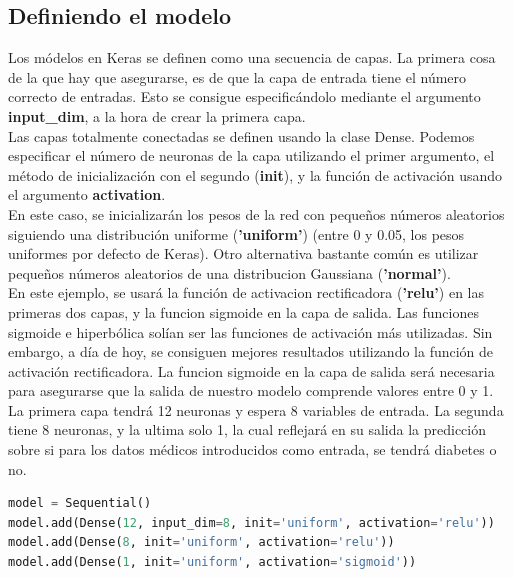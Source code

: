 \subsection{Definiendo el modelo}
Los módelos en Keras se definen como una secuencia de capas. La primera cosa de la que hay que asegurarse, es de que la capa de entrada tiene el número correcto de entradas. Esto se consigue especificándolo mediante el argumento \textbf{input\_dim}, a la hora de crear la primera capa.\\
Las capas totalmente conectadas se definen usando la clase Dense. Podemos especificar el número de neuronas de la capa utilizando el primer argumento, el método de inicialización con el segundo (\textbf{init}), y la función de activación usando el argumento \textbf{activation}.\\
En este caso, se inicializarán los pesos de la red con pequeños números aleatorios siguiendo una distribución uniforme (\textbf{'uniform'}) (entre 0 y 0.05, los pesos uniformes por defecto de Keras). Otro alternativa bastante común es utilizar pequeños números aleatorios de una distribucion Gaussiana (\textbf{'normal'}).\\
En este ejemplo, se usará la función de activacion rectificadora (\textbf{'relu'}) en las primeras dos capas, y la funcion sigmoide en la capa de salida. Las funciones sigmoide e hiperbólica solían ser las funciones de activación más utilizadas. Sin embargo, a día de hoy, se consiguen mejores resultados utilizando la función de activación rectificadora. La funcion sigmoide en la capa de salida será necesaria para asegurarse que la salida de nuestro modelo comprende valores entre 0 y 1.\\
La primera capa tendrá 12 neuronas y espera 8 variables de entrada. La segunda tiene 8 neuronas, y la ultima solo 1, la cual reflejará en su salida la predicción sobre si para los datos médicos introducidos como entrada, se tendrá diabetes o no.
\begin{lstlisting}[language=Python]
model = Sequential()
model.add(Dense(12, input_dim=8, init='uniform', activation='relu'))
model.add(Dense(8, init='uniform', activation='relu'))
model.add(Dense(1, init='uniform', activation='sigmoid'))
\end{lstlisting}

